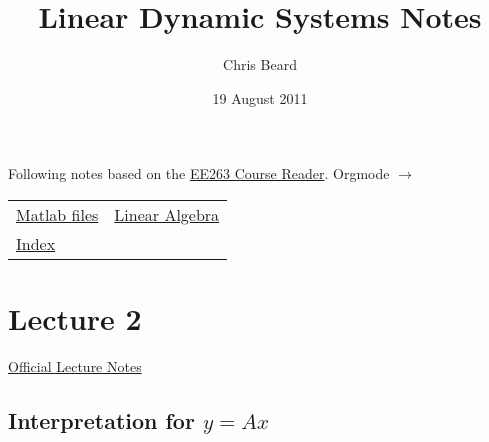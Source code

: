 \documentclass[10pt,letterpaper]{article}
\begin{document}
\title{Linear Dynamic Systems Notes}
\author{Chris Beard}
\date{19 August 2011}
\maketitle

\setcounter{tocdepth}{3}
\tableofcontents
\vspace*{1cm}
Following notes based on the \href{file://.~/Desktop/Engineering/kiet-ee-downloads/current/ee263_course_reader.pdf}{EE263 Course Reader}. Orgmode $\rightarrow$ \LaTeXe

\begin{center}
\begin{tabular}{ll}
 \href{http://www.stanford.edu/~boyd/ee263/matlab/}{Matlab files}                                       &  \href{file://.~/Dropbox/AK-MBP/edu/systems/linear-algebra-notes.pdf}{Linear Algebra}  \\
 \href{file:///Users/FingerMan/Dropbox/AK-MBP/edu/systems/IntroToLinearDynamicalSys/index.html}{Index}  &                                                                                        \\
\end{tabular}
\end{center}


\section{Lecture 2}
\label{sec-1}

\href{file:///Users/FingerMan/Dropbox/AK-MBP/edu/systems/IntroToLinearDynamicalSys/materials/lsoeldsee263/02-lin-fcts.pdf}{Official Lecture Notes}
\subsection{Interpretation for $y=Ax$}
\label{sec-1_1}
\end{document}
